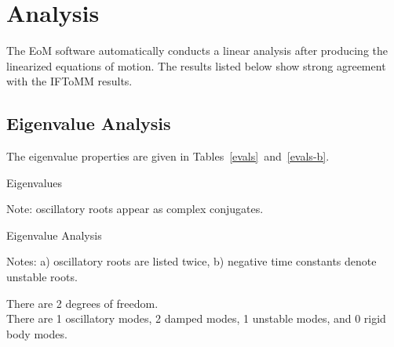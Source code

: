 \chapter{Analysis}
The EoM software automatically conducts a linear analysis after producing the linearized equations of motion.  The results listed below show strong agreement with the IFToMM results.
\section{Eigenvalue Analysis}
The eigenvalue properties are given in Tables~\ref{evals}~and~\ref{evals-b}.

\begin{table}[ht]
\begin{center}
\begin{threeparttable}
\begin{footnotesize}
\caption{Eigenvalues}
\label{evals}
\begin{tablenotes}
\item Note: oscillatory roots appear as complex conjugates.
\end{tablenotes}
\end{footnotesize}
\end{threeparttable}
\end{center}
\end{table}
\begin{table}[ht]
\begin{center}
\begin{threeparttable}
\begin{footnotesize}
\caption{Eigenvalue Analysis}
\label{evals-b}
\begin{tablenotes}
\item Notes: a) oscillatory roots are listed twice, b) negative time constants denote unstable roots.
\end{tablenotes}
\end{footnotesize}
\end{threeparttable}
\end{center}
\end{table}
There are 2 degrees of freedom.\\

There are 1 oscillatory modes, 2 damped modes, 1 unstable modes, and 0 rigid body modes.
\pagebreak
